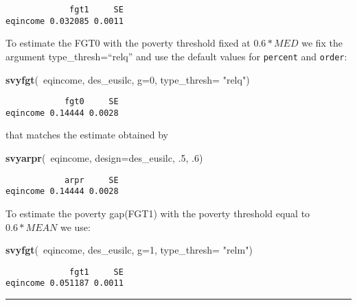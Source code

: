 \documentclass[]{book}
\newenvironment{Shaded}{\begin{snugshade}}{\end{snugshade}}
\newcommand{\KeywordTok}[1]{\textcolor[rgb]{0.13,0.29,0.53}{\textbf{{#1}}}}
\newcommand{\DataTypeTok}[1]{\textcolor[rgb]{0.13,0.29,0.53}{{#1}}}
\newcommand{\DecValTok}[1]{\textcolor[rgb]{0.00,0.00,0.81}{{#1}}}
\newcommand{\StringTok}[1]{\textcolor[rgb]{0.31,0.60,0.02}{{#1}}}
\newcommand{\NormalTok}[1]{{#1}}
\theoremstyle{definition}
\theoremstyle{definition}
\theoremstyle{remark}
\begin{document}
\begin{verbatim}
             fgt1     SE
eqincome 0.032085 0.0011
\end{verbatim}

To estimate the FGT0 with the poverty threshold fixed at \(0.6* MED\) we
fix the argument type\_thresh=``relq'' and use the default values for
\texttt{percent} and \texttt{order}:

\begin{Shaded}
\begin{Highlighting}[]
\KeywordTok{svyfgt}\NormalTok{(~eqincome, des_eusilc, }\DataTypeTok{g=}\DecValTok{0}\NormalTok{, }\DataTypeTok{type_thresh=} \StringTok{"relq"}\NormalTok{)}
\end{Highlighting}
\end{Shaded}

\begin{verbatim}
            fgt0     SE
eqincome 0.14444 0.0028
\end{verbatim}

that matches the estimate obtained by

\begin{Shaded}
\begin{Highlighting}[]
\KeywordTok{svyarpr}\NormalTok{(~eqincome, }\DataTypeTok{design=}\NormalTok{des_eusilc, .}\DecValTok{5}\NormalTok{, .}\DecValTok{6}\NormalTok{)}
\end{Highlighting}
\end{Shaded}

\begin{verbatim}
            arpr     SE
eqincome 0.14444 0.0028
\end{verbatim}

To estimate the poverty gap(FGT1) with the poverty threshold equal to
\(0.6*MEAN\) we use:

\begin{Shaded}
\begin{Highlighting}[]
\KeywordTok{svyfgt}\NormalTok{(~eqincome, des_eusilc, }\DataTypeTok{g=}\DecValTok{1}\NormalTok{, }\DataTypeTok{type_thresh=} \StringTok{"relm"}\NormalTok{)}
\end{Highlighting}
\end{Shaded}

\begin{verbatim}
             fgt1     SE
eqincome 0.051187 0.0011
\end{verbatim}

\begin{center}\rule{0.5\linewidth}{\linethickness}\end{center}
\end{document}
